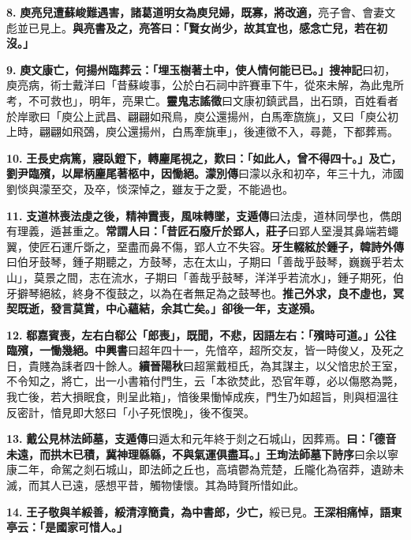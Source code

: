 \textbf{8.} \textbf{庾亮兒遭蘇峻難遇害，諸葛道明女為庾兒婦，既寡，將改適，}{\footnotesize 亮子會、會妻文彪並已見上。}\textbf{與亮書及之，亮答曰：「賢女尚少，故其宜也，感念亡兒，若在初沒。」}

\textbf{9.} \textbf{庾文康亡，何揚州臨葬云：「埋玉樹著土中，使人情何能已已。」}{\footnotesize \textbf{搜神記}曰初，庾亮病，術士戴洋曰「昔蘇峻事，公於白石祠中許賽車下牛，從來未解，為此鬼所考，不可救也」，明年，亮果亡。\textbf{靈鬼志謠徵}曰文康初鎮武昌，出石頭，百姓看者於岸歌曰「庾公上武昌、翩翩如飛鳥，庾公還揚州，白馬牽旒旐」，又曰「庾公初上時，翩翩如飛鵶，庾公還揚州，白馬牽旐車」，後連徵不入，尋薨，下都葬焉。}

\textbf{10.} \textbf{王長史病篤，寢臥鐙下，轉麈尾視之，歎曰：「如此人，曾不得四十。」及亡，劉尹臨殯，以犀柄麈尾著柩中，因慟絕。}{\footnotesize \textbf{濛別傳}曰濛以永和初卒，年三十九，沛國劉惔與濛至交，及卒，惔深悼之，雖友于之愛，不能過也。}

\textbf{11.} \textbf{支道林喪法虔之後，精神霣喪，風味轉墜，}{\footnotesize \textbf{支遁傳}曰法虔，道林同學也，儁朗有理義，遁甚重之。}\textbf{常謂人曰：「昔匠石廢斤於郢人，}{\footnotesize \textbf{莊子}曰郢人堊漫其鼻端若蠅翼，使匠石運斤斲之，堊盡而鼻不傷，郢人立不失容。}\textbf{牙生輟絃於鍾子，}{\footnotesize \textbf{韓詩外傳}曰伯牙鼓琴，鍾子期聽之，方鼓琴，志在太山，子期曰「善哉乎鼓琴，巍巍乎若太山」，莫景之間，志在流水，子期曰「善哉乎鼓琴，洋洋乎若流水」，鍾子期死，伯牙擗琴絕絃，終身不復鼓之，以為在者無足為之鼓琴也。}\textbf{推己外求，良不虛也，冥契既逝，發言莫賞，中心蘊結，余其亡矣。」卻後一年，支遂殞。}

\textbf{12.} \textbf{郗嘉賓喪，左右白郗公「郎喪」，既聞，不悲，因語左右：「殯時可道。」公往臨殯，一慟幾絕。}{\footnotesize \textbf{中興書}曰超年四十一，先愔卒，超所交友，皆一時俊乂，及死之日，貴賤為誄者四十餘人。\textbf{續晉陽秋}曰超黨戴桓氏，為其謀主，以父愔忠於王室，不令知之，將亡，出一小書箱付門生，云「本欲焚此，恐官年尊，必以傷愍為斃，我亡後，若大損眠食，則呈此箱」，愔後果慟悼成疾，門生乃如超旨，則與桓溫往反密計，愔見即大怒曰「小子死恨晚」，後不復哭。}

\textbf{13.} \textbf{戴公見林法師墓，}{\footnotesize \textbf{支遁傳}曰遁太和元年終于剡之石城山，因葬焉。}\textbf{曰：「德音未遠，而拱木已積，冀神理緜緜，不與氣運俱盡耳。」}{\footnotesize \textbf{王珣法師墓下詩序}曰余以寧康二年，命駕之剡石城山，即法師之丘也，高墳鬱為荒楚，丘隴化為宿莽，遺跡未滅，而其人已遠，感想平昔，觸物悽懷。其為時賢所惜如此。}

\textbf{14.} \textbf{王子敬與羊綏善，綏清淳簡貴，為中書郎，少亡，}{\footnotesize 綏已見。}\textbf{王深相痛悼，語東亭云：「是國家可惜人。」}

